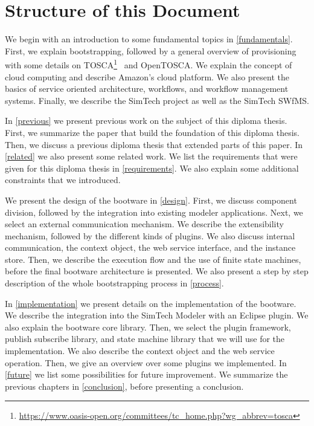 \section{Structure of this Document}

We begin with an introduction to some fundamental topics in \autoref{fundamentals}.
First, we explain bootstrapping, followed by a general overview of provisioning with some details on TOSCA\footnote{\url{https://www.oasis-open.org/committees/tc_home.php?wg_abbrev=tosca}}~\autocite{tosca:spec} and OpenTOSCA.
We explain the concept of cloud computing and describe Amazon's cloud platform.
We also present the basics of service oriented architecture, workflows, and workflow management systems.
Finally, we describe the SimTech project as well as the SimTech SWfMS.

In \autoref{previous} we present previous work on the subject of this diploma thesis.
First, we summarize the paper that build the foundation of this diploma thesis.
Then, we discuss a previous diploma thesis that extended parts of this paper.
In \autoref{related} we also present some related work.
We list the requirements that were given for this diploma thesis in \autoref{requirements}.
We also explain some additional constraints that we introduced.

We present the design of the bootware in \autoref{design}.
First, we discuss component division, followed by the integration into existing modeler applications.
Next, we select an external communication mechanism.
We describe the extensibility mechanism, followed by the different kinds of plugins.
We also discuss internal communication, the context object, the web service interface, and the instance store.
Then, we describe the execution flow and the use of finite state machines, before the final bootware architecture is presented.
We also present a step by step description of the whole bootstrapping process in \autoref{process}.

In \autoref{implementation} we present details on the implementation of the bootware.
We describe the integration into the SimTech Modeler with an Eclipse plugin.
We also explain the bootware core library.
Then, we select the plugin framework, publish subscribe library, and state machine library that we will use for the implementation.
We also describe the context object and the web service operation.
Then, we give an overview over some plugins we implemented.
In \autoref{future} we list some possibilities for future improvement.
We summarize the previous chapters in \autoref{conclusion}, before presenting a conclusion.
